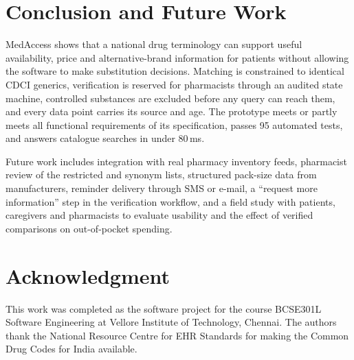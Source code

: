 \documentclass[conference]{IEEEtran}
\begin{document}
\section{Conclusion and Future Work}\label{sec:concl}
MedAccess shows that a national drug terminology can support useful availability, price and alternative-brand information for patients without allowing the software to make substitution decisions. Matching is constrained to identical CDCI generics, verification is reserved for pharmacists through an audited state machine, controlled substances are excluded before any query can reach them, and every data point carries its source and age. The prototype meets or partly meets all functional requirements of its specification, passes 95 automated tests, and answers catalogue searches in under 80\,ms.

Future work includes integration with real pharmacy inventory feeds, pharmacist review of the restricted and synonym lists, structured pack-size data from manufacturers, reminder delivery through SMS or e-mail, a ``request more information'' step in the verification workflow, and a field study with patients, caregivers and pharmacists to evaluate usability and the effect of verified comparisons on out-of-pocket spending.

\section*{Acknowledgment}
This work was completed as the software project for the course BCSE301L Software Engineering at Vellore Institute of Technology, Chennai. The authors thank the National Resource Centre for EHR Standards for making the Common Drug Codes for India available.
\end{document}

